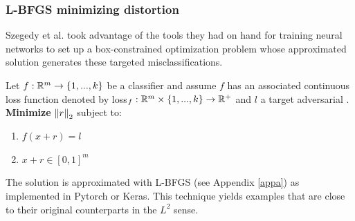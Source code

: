 \subsubsection{L-BFGS minimizing distortion}\label{lbfgs}

Szegedy et al. took advantage of the tools they had on hand for training neural networks to set up a box-constrained optimization problem whose approximated solution generates these targeted misclassifications. 


Let $f : \mathbb{R}^m \to \{1,...,k\}$ be a classifier and assume $f$ has an associated continuous loss function denoted by loss$_f : \mathbb{R}^m \times \{1,...,k\} \to \mathbb{R}^+$ and $l$ a target adversarial . \\
\textbf{ Minimize} $\left\Vert r \right\Vert_2$ subject to:
\begin{enumerate}[1.]
\item $f(x + r) = l$
\item $x + r \in [0,1]^m$
\end{enumerate}

The solution is approximated with L-BFGS (see Appendix \ref{appa}) as implemented in Pytorch or Keras. This technique yields examples that are close to their original counterparts in the $L^2$ sense.  \\



